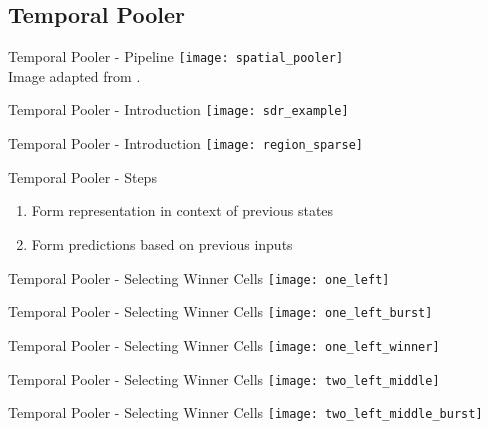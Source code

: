 \subsection{Temporal Pooler}


\begin{frame}[c]{Temporal Pooler - Pipeline}
    \texttt{[image: spatial\_pooler]} \\
    \normalsize
    Image adapted from \cite{cui2017htm}.
\end{frame}


\begin{frame}[c]{Temporal Pooler - Introduction}
    \texttt{[image: sdr\_example]}
\end{frame}


\begin{frame}[c]{Temporal Pooler - Introduction}
    \texttt{[image: region\_sparse]}
\end{frame}


\begin{frame}[c]{Temporal Pooler - Steps}
    \Large
    \begin{enumerate}[<+(1)->]
        \item Form representation in context of previous states
        \item Form predictions based on previous inputs
    \end{enumerate}
\end{frame}


\begin{frame}[c]{Temporal Pooler - Selecting Winner Cells}
    \texttt{[image: one\_left]}
\end{frame}

\begin{frame}[c]{Temporal Pooler - Selecting Winner Cells}
    \texttt{[image: one\_left\_burst]}
\end{frame}

\begin{frame}[c]{Temporal Pooler - Selecting Winner Cells}
    \texttt{[image: one\_left\_winner]}
\end{frame}

\begin{frame}[c]{Temporal Pooler - Selecting Winner Cells}
    \texttt{[image: two\_left\_middle]}
\end{frame}

\begin{frame}[c]{Temporal Pooler - Selecting Winner Cells}
    \texttt{[image: two\_left\_middle\_burst]}
\end{frame}

